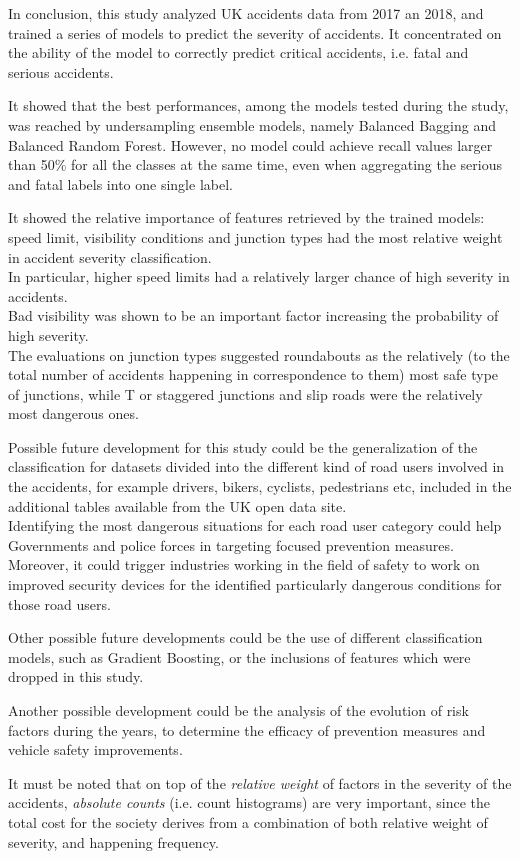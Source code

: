 \documentclass[11pt]{article}
\begin{document}
In conclusion, this study analyzed UK accidents data from 2017 an 2018, and trained a series of models to predict the severity of accidents. It concentrated on the ability of the model to correctly predict critical accidents, i.e. fatal and serious accidents.

It showed that the best performances, among the models tested during the study, was reached by undersampling ensemble models, namely Balanced Bagging and Balanced Random Forest. However, no model could achieve recall values larger than 50\% for all the classes at the same time, even when aggregating the serious and fatal labels into one single label.

It showed the relative importance of features retrieved by the trained models: speed limit, visibility conditions and junction types had the most relative weight in accident severity classification.\\
In particular, higher speed limits had a relatively larger chance of high severity in accidents.\\
Bad visibility was shown to be an important factor increasing the probability of high severity.\\
The evaluations on junction types suggested roundabouts as the relatively (to the total number of accidents happening in correspondence to them) most safe type of junctions, while T or staggered junctions and slip roads were the relatively most dangerous ones.

Possible future development for this study could be the generalization of the classification for datasets divided into the different kind of road users involved in the accidents, for example drivers, bikers, cyclists, pedestrians etc, included in the additional tables available from the UK open data site.\\
Identifying the most dangerous situations for each road user category could help Governments and police forces in targeting focused prevention measures. Moreover, it could trigger industries working in the field of safety to work on improved security devices for the identified particularly dangerous conditions for those road users.

Other possible future developments could be the use of different classification models, such as Gradient Boosting, or the inclusions of features which were dropped in this study.

Another possible development could be the analysis of the evolution of risk factors during the years, to determine the efficacy of prevention measures and vehicle safety improvements.

It must be noted that on top of the \textit{relative weight} of factors in the severity of the accidents, \textit{absolute counts} (i.e. count histograms) are very important, since the total cost for the society derives from a combination of both relative weight of severity, and happening frequency.
\end{document}
